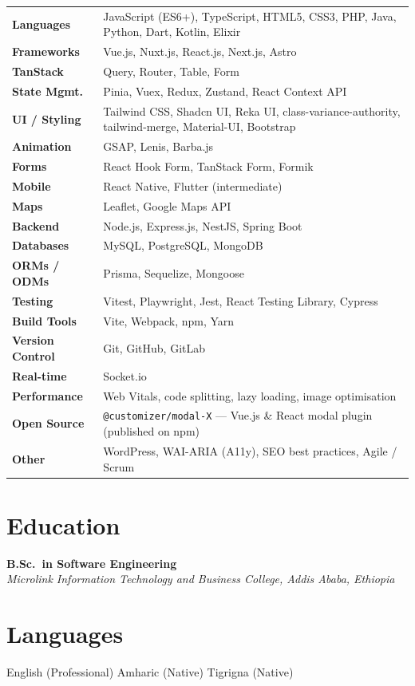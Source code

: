 \documentclass[10pt,a4paper]{article}
\begin{document}
\renewcommand{\arraystretch}{1.4}
\begin{tabular}{@{}p{2.6cm}p{12.8cm}@{}}
\textbf{Languages}        & JavaScript (ES6+), TypeScript, HTML5, CSS3, PHP, Java, Python, Dart, Kotlin, Elixir \\
\textbf{Frameworks}       & Vue.js, Nuxt.js, React.js, Next.js, Astro \\
\textbf{TanStack}         & Query, Router, Table, Form \\
\textbf{State Mgmt.}      & Pinia, Vuex, Redux, Zustand, React Context API \\
\textbf{UI / Styling}     & Tailwind CSS, Shadcn UI, Reka UI, class-variance-authority, tailwind-merge, Material-UI, Bootstrap \\
\textbf{Animation}        & GSAP, Lenis, Barba.js \\
\textbf{Forms}            & React Hook Form, TanStack Form, Formik \\
\textbf{Mobile}           & React Native, Flutter (intermediate) \\
\textbf{Maps}             & Leaflet, Google Maps API \\
\textbf{Backend}          & Node.js, Express.js, NestJS, Spring Boot \\
\textbf{Databases}        & MySQL, PostgreSQL, MongoDB \\
\textbf{ORMs / ODMs}      & Prisma, Sequelize, Mongoose \\
\textbf{Testing}          & Vitest, Playwright, Jest, React Testing Library, Cypress \\
\textbf{Build Tools}      & Vite, Webpack, npm, Yarn \\
\textbf{Version Control}  & Git, GitHub, GitLab \\
\textbf{Real-time}        & Socket.io \\
\textbf{Performance}      & Web Vitals, code splitting, lazy loading, image optimisation \\
\textbf{Open Source}      & \texttt{@customizer/modal-X} --- Vue.js \& React modal plugin (published on npm) \\
\textbf{Other}            & WordPress, WAI-ARIA (A11y), SEO best practices, Agile / Scrum \\
\end{tabular}

\section{Education}

\textbf{B.Sc.\ in Software Engineering}\\
\textit{Microlink Information Technology and Business College, Addis Ababa, Ethiopia}

\section{Languages}

English (Professional) \quad\textbar\quad Amharic (Native) \quad\textbar\quad Tigrigna (Native)
\end{document}
